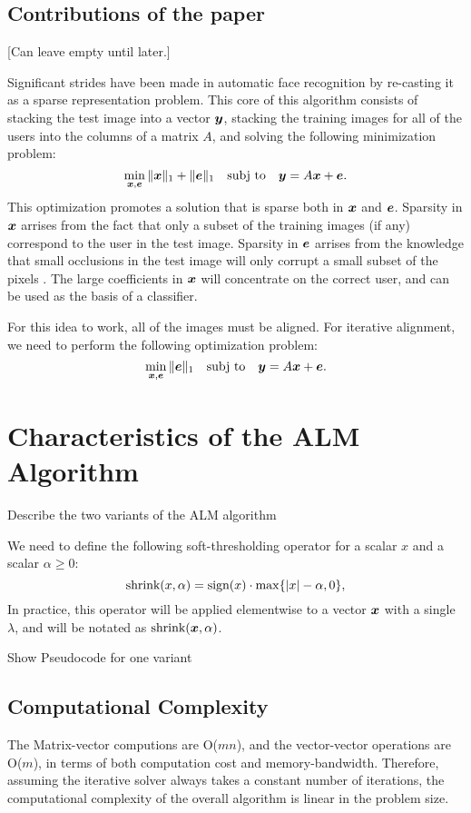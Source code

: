 \documentclass[10pt,twocolumn,letterpaper]{article}
\begin{document}
\subsection{Contributions of the paper}
[Can leave empty until later.]


Significant strides have been made in automatic face recognition by re-casting
it as a sparse representation problem.  This core of this algorithm consists of
stacking the test image into a vector ${\boldsymbol{y}}$, stacking the training images for
all of the users into the columns of a matrix $A$, and solving the following
minimization problem:
\begin{equation}
\min_{{\boldsymbol{x}}, \boldsymbol{e}} \| {\boldsymbol{x}} \|_1 + \|\boldsymbol{e}\|_1 \quad \textup{subj to} \quad {\boldsymbol{y}} = A {\boldsymbol{x}} + \boldsymbol{e}.
\end{equation}
This optimization promotes a solution that is sparse both in ${\boldsymbol{x}}$ and $\boldsymbol{e}$. 
Sparsity in ${\boldsymbol{x}}$ arrises from the fact that only a subset of the training images (if any)
correspond to the user in the test image.  Sparsity in $\boldsymbol{e}$ arrises from the knowledge
that small occlusions in the test image will only corrupt a small subset of the pixels \cite{Wright2009-PAMI}.
The large coefficients in ${\boldsymbol{x}}$ will concentrate on the correct user, and can be used as the basis of a classifier.

For this idea to work, all of the images must be aligned. \cite{Wagner2009-CVPR}
For iterative alignment, we need to perform the following optimization problem:
\begin{equation}
\min_{{\boldsymbol{x}}, \boldsymbol{e}} \|\boldsymbol{e}\|_1 \quad \textup{subj to} \quad {\boldsymbol{y}} = A {\boldsymbol{x}} + \boldsymbol{e}.
\end{equation}


\section{Characteristics of the ALM Algorithm}
Describe the two variants of the ALM algorithm

We need to define the following soft-thresholding operator for a
scalar $x$ and a scalar $\alpha \geq 0$:
\begin{equation}
\textup{shrink}(x,\alpha) = \textup{sign}(x)\cdot \max \{|x| - \alpha, 0\},
\end{equation}
In practice, this operator will be applied elementwise to a vector ${\boldsymbol{x}}$ with a single $\lambda$,
and will be notated as $\textup{shrink}({\boldsymbol{x}},\alpha)$.

Show Pseudocode for one variant
\subsection{Computational Complexity}
The Matrix-vector computions are O($mn$), and the vector-vector operations are O($m$), 
in terms of both computation cost and memory-bandwidth.
Therefore, assuming the iterative solver always takes a constant number of iterations,
the computational complexity of the overall algorithm is linear in the problem size.
\end{document}
